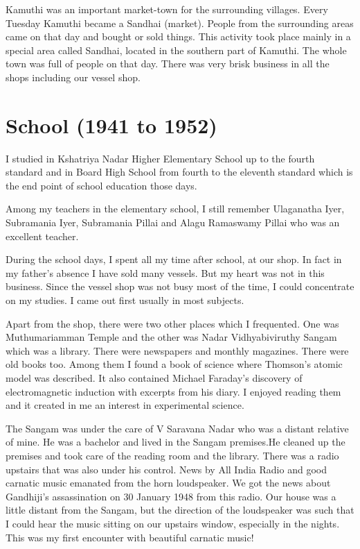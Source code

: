 Kamuthi was an important market-town for the surrounding villages. Every 
Tuesday Kamuthi became a Sandhai (market). People from the surrounding 
areas came on that day and bought or sold things. This activity took 
place mainly in a special area called Sandhai, located in the southern 
part of Kamuthi. The whole town was full of people on that day. There 
was very brisk business in all the shops including our vessel shop.

\section*{School (1941 to 1952)}
I studied in Kshatriya Nadar Higher Elementary School up to the fourth
standard and in Board High School from fourth to the eleventh standard
which is the end point of school education those days.

Among my teachers in the elementary school, I still remember Ulaganatha
Iyer, Subramania Iyer, Subramania Pillai and Alagu Ramaswamy Pillai who
was an excellent teacher.

During the school days, I spent all my time after school, at our shop. 
In fact in my father's absence I have sold many vessels. But my heart was 
not in this business. Since the vessel shop was not busy most of the 
time, I could concentrate on my studies. I came out first usually in 
most subjects.

Apart from the shop, there were two other places which I frequented. One 
was Muthumariamman Temple and the other was Nadar Vidhyabiviruthy Sangam 
which was a library. There were newspapers and monthly magazines. There 
were old books too. Among them I found a book of science where Thomson's 
atomic model was described. It also contained Michael Faraday's 
discovery of electromagnetic induction with excerpts from his diary. I 
enjoyed reading them and it created in me an interest in experimental 
science.

The Sangam was under the care of V Saravana Nadar who was a distant 
relative of mine. He was a bachelor and lived in the Sangam premises.He 
cleaned up the premises and took care of the reading room and the 
library. There was a radio upstairs that was also under his control. 
News by All India Radio and good carnatic music emanated from the horn 
loudspeaker. We got the news about Gandhiji's assassination on 30 
January 1948 from this radio. Our house was a little distant from the 
Sangam, but the direction of the loudspeaker was such that I could hear 
the music sitting on our upstairs window, especially in the nights. 
This was my first encounter with beautiful carnatic music!

